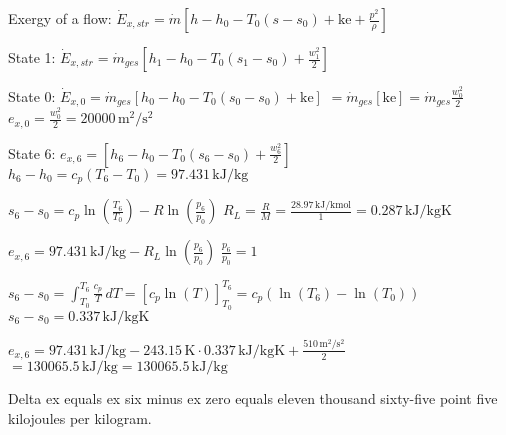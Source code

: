 Exergy of a flow:  
\( \dot{E}_{x,str} = \dot{m} \left[ h - h_0 - T_0 (s - s_0) + \text{ke} + \frac{p^2}{\rho} \right] \)  

State 1:  
\( \dot{E}_{x,str} = \dot{m}_{ges} \left[ h_1 - h_0 - T_0 (s_1 - s_0) + \frac{w_1^2}{2} \right] \)  

State 0:  
\( \dot{E}_{x,0} = \dot{m}_{ges} \left[ h_0 - h_0 - T_0 (s_0 - s_0) + \text{ke} \right] \)  
\( = \dot{m}_{ges} \left[ \text{ke} \right] = \dot{m}_{ges} \frac{w_0^2}{2} \)  
\( e_{x,0} = \frac{w_0^2}{2} = 20000 \, \text{m}^2/\text{s}^2 \)  

State 6:  
\( e_{x,6} = \left[ h_6 - h_0 - T_0 (s_6 - s_0) + \frac{w_6^2}{2} \right] \)  
\( h_6 - h_0 = c_p (T_6 - T_0) = 97.431 \, \text{kJ/kg} \)  

\( s_6 - s_0 = c_p \ln \left( \frac{T_6}{T_0} \right) - R \ln \left( \frac{p_6}{p_0} \right) \)  
\( R_L = \frac{R}{M} = \frac{28.97 \, \text{kJ/kmol}}{1} = 0.287 \, \text{kJ/kgK} \)  

\( e_{x,6} = 97.431 \, \text{kJ/kg} - R_L \ln \left( \frac{p_6}{p_0} \right) \)  
\( \frac{p_6}{p_0} = 1 \)  

\( s_6 - s_0 = \int_{T_0}^{T_6} \frac{c_p}{T} \, dT = \left[ c_p \ln (T) \right]_{T_0}^{T_6} = c_p \left( \ln (T_6) - \ln (T_0) \right) \)  
\( s_6 - s_0 = 0.337 \, \text{kJ/kgK} \)  

\( e_{x,6} = 97.431 \, \text{kJ/kg} - 243.15 \, \text{K} \cdot 0.337 \, \text{kJ/kgK} + \frac{510 \, \text{m}^2/\text{s}^2}{2} \)  
\( = 130065.5 \, \text{kJ/kg} = 130065.5 \, \text{kJ/kg} \)

Delta ex equals ex six minus ex zero equals eleven thousand sixty-five point five kilojoules per kilogram.